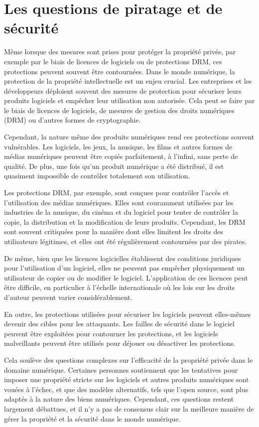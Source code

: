 \section{Les questions de piratage et de sécurité} 
Même lorsque des mesures sont prises pour protéger la propriété privée, par exemple par le biais de licences de logiciels ou de protections DRM, ces protections peuvent souvent être contournées.
Dans le monde numérique, la protection de la propriété intellectuelle est un enjeu crucial. Les entreprises et les développeurs déploient souvent des mesures de protection pour sécuriser leurs produits logiciels et empêcher leur utilisation non autorisée. Cela peut se faire par le biais de licences de logiciels, de mesures de gestion des droits numériques (DRM) ou d'autres formes de cryptographie.

Cependant, la nature même des produits numériques rend ces protections souvent vulnérables. Les logiciels, les jeux, la musique, les films et autres formes de médias numériques peuvent être copiés parfaitement, à l'infini, sans perte de qualité. De plus, une fois qu'un produit numérique a été distribué, il est quasiment impossible de contrôler totalement son utilisation.

Les protections DRM, par exemple, sont conçues pour contrôler l'accès et l'utilisation des médias numériques. Elles sont couramment utilisées par les industries de la musique, du cinéma et du logiciel pour tenter de contrôler la copie, la distribution et la modification de leurs produits. Cependant, les DRM sont souvent critiquées pour la manière dont elles limitent les droits des utilisateurs légitimes, et elles ont été régulièrement contournées par des pirates.

De même, bien que les licences logicielles établissent des conditions juridiques pour l'utilisation d'un logiciel, elles ne peuvent pas empêcher physiquement un utilisateur de copier ou de modifier le logiciel. L'application de ces licences peut être difficile, en particulier à l'échelle internationale où les lois sur les droits d'auteur peuvent varier considérablement.

En outre, les protections utilisées pour sécuriser les logiciels peuvent elles-mêmes devenir des cibles pour les attaquants. Les failles de sécurité dans le logiciel peuvent être exploitées pour contourner les protections, et les logiciels malveillants peuvent être utilisés pour déjouer ou désactiver les protections.

Cela soulève des questions complexes sur l'efficacité de la propriété privée dans le domaine numérique. Certaines personnes soutiennent que les tentatives pour imposer une propriété stricte sur les logiciels et autres produits numériques sont vouées à l'échec, et que des modèles alternatifs, tels que l'open source, sont plus adaptés à la nature des biens numériques. Cependant, ces questions restent largement débattues, et il n'y a pas de consensus clair sur la meilleure manière de gérer la propriété et la sécurité dans le monde numérique.

